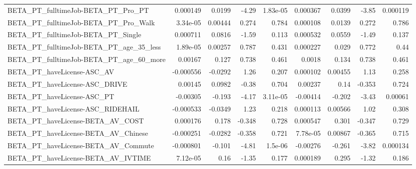 \begin{tabular}{lrrrrrrrr}
BETA\_PT\_fulltimeJob-BETA\_PT\_Pro\_PT                 &    0.000149 &       0.0199 &    -4.29 & 1.83e-05 &   0.000367 &      0.0399 &        -3.85 &      0.000119 \\
BETA\_PT\_fulltimeJob-BETA\_PT\_Pro\_Walk               &    3.34e-05 &      0.00444 &    0.274 &    0.784 &   0.000108 &      0.0139 &        0.272 &         0.786 \\
BETA\_PT\_fulltimeJob-BETA\_PT\_Single                 &    0.000711 &       0.0816 &    -1.59 &    0.113 &   0.000532 &      0.0559 &        -1.49 &         0.137 \\
BETA\_PT\_fulltimeJob-BETA\_PT\_age\_35\_less            &    1.89e-05 &      0.00257 &    0.787 &    0.431 &   0.000227 &       0.029 &        0.772 &          0.44 \\
BETA\_PT\_fulltimeJob-BETA\_PT\_age\_60\_more            &     0.00167 &        0.127 &    0.738 &    0.461 &     0.0018 &       0.134 &        0.738 &         0.461 \\
BETA\_PT\_haveLicense-ASC\_AV                         &   -0.000556 &      -0.0292 &     1.26 &    0.207 &   0.000102 &     0.00455 &         1.13 &         0.258 \\
BETA\_PT\_haveLicense-ASC\_DRIVE                      &     0.00145 &       0.0982 &    -0.38 &    0.704 &    0.00237 &        0.14 &       -0.353 &         0.724 \\
BETA\_PT\_haveLicense-ASC\_PT                         &    -0.00305 &       -0.193 &    -4.17 & 3.11e-05 &   -0.00414 &      -0.202 &        -3.43 &       0.00061 \\
BETA\_PT\_haveLicense-ASC\_RIDEHAIL                   &   -0.000533 &      -0.0349 &     1.23 &    0.218 &   0.000113 &     0.00566 &         1.02 &         0.308 \\
BETA\_PT\_haveLicense-BETA\_AV\_COST                   &    0.000176 &        0.178 &   -0.348 &    0.728 &   0.000547 &       0.301 &       -0.347 &         0.729 \\
BETA\_PT\_haveLicense-BETA\_AV\_Chinese                &   -0.000251 &      -0.0282 &   -0.358 &    0.721 &   7.78e-05 &     0.00867 &       -0.365 &         0.715 \\
BETA\_PT\_haveLicense-BETA\_AV\_Commute                &   -0.000801 &       -0.101 &    -4.81 &  1.5e-06 &   -0.00276 &      -0.261 &        -3.82 &      0.000134 \\
BETA\_PT\_haveLicense-BETA\_AV\_IVTIME                 &    7.12e-05 &         0.16 &    -1.35 &    0.177 &   0.000189 &       0.295 &        -1.32 &         0.186 \\

\end{tabular}
